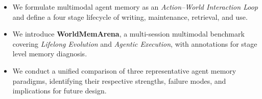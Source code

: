 \documentclass{article}
\begin{document}
\begin{itemize}[left=0.2cm]
    \item We formulate multimodal agent memory as an \textit{Action--World Interaction Loop} and define a four stage lifecycle of writing, maintenance, retrieval, and use.

    \item We introduce \textbf{WorldMemArena}, a multi-session multimodal benchmark covering \textit{Lifelong Evolution} and \textit{Agentic Execution}, with annotations for stage level memory diagnosis.

    \item We conduct a unified comparison of three representative agent memory paradigms, identifying their respective strengths, failure modes, and implications for future design.
\end{itemize}

\end{document}
